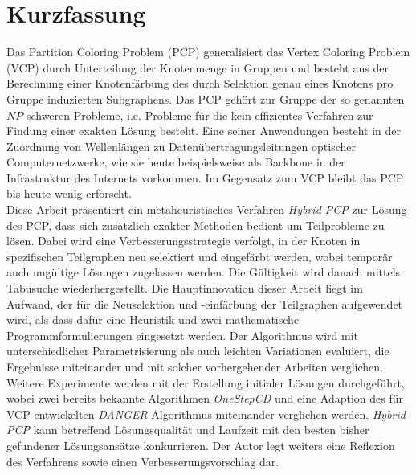 \chapter*{Kurzfassung}

Das Partition Coloring Problem (PCP) generalisiert das Vertex Coloring Problem (VCP) durch Unterteilung der Knotenmenge in Gruppen und besteht aus der Berechnung einer Knotenfärbung des durch Selektion genau eines Knotens pro Gruppe induzierten Subgraphens. Das PCP gehört zur Gruppe der so genannten $\mathit{NP}$-schweren Probleme, i.e. Probleme für die kein effizientes Verfahren zur Findung einer exakten Lösung besteht. Eine seiner Anwendungen besteht in der Zuordnung von Wellenlängen zu Datenübertragungsleitungen optischer Computernetzwerke, wie sie heute beispielsweise als Backbone in der Infrastruktur des Internets vorkommen. Im Gegensatz zum VCP bleibt das PCP bis heute wenig erforscht.\\

Diese Arbeit präsentiert ein metaheuristisches Verfahren \textit{Hybrid-PCP} zur Lösung des PCP, dass sich zusätzlich exakter Methoden bedient um Teilprobleme zu lösen. Dabei wird eine Verbesserungsstrategie verfolgt, in der Knoten in spezifischen Teilgraphen neu selektiert und eingefärbt werden, wobei temporär auch ungültige Lösungen zugelassen werden. Die Gültigkeit wird danach mittels Tabusuche wiederhergestellt. Die Hauptinnovation dieser Arbeit liegt im Aufwand, der für die Neuselektion und -einfärbung der Teilgraphen aufgewendet wird, als dass dafür eine Heuristik und zwei mathematische Programmformulierungen eingesetzt werden. Der Algorithmus wird mit unterschiedlicher Parametrisierung als auch leichten Variationen evaluiert, die Ergebnisse miteinander und mit solcher vorhergehender Arbeiten verglichen. Weitere Experimente werden mit der Erstellung initialer Lösungen durchgeführt, wobei zwei bereits bekannte Algorithmen \textit{OneStepCD} und eine Adaption des für VCP entwickelten \textit{DANGER} Algorithmus miteinander verglichen werden. \textit{Hybrid-PCP} kann betreffend Lösungsqualität und Laufzeit mit den besten bisher gefundener Lösungsansätze konkurrieren. Der Autor legt weiters eine Reflexion des Verfahrens sowie einen Verbesserungsvorschlag dar.
